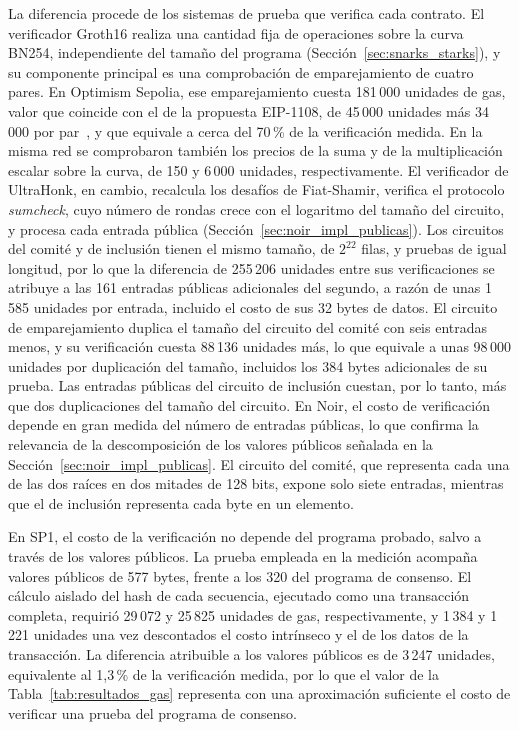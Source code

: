La diferencia procede de los sistemas de prueba que verifica cada contrato. El verificador Groth16
realiza una cantidad fija de operaciones sobre la curva BN254, independiente del tamaño del
programa (Sección~\ref{sec:snarks_starks}), y su componente principal es una comprobación de
emparejamiento de cuatro pares. En Optimism Sepolia, ese emparejamiento cuesta 181\,000 unidades
de gas, valor que coincide con el de la propuesta EIP-1108, de 45\,000 unidades más 34\,000 por
par~\cite{eip1108}, y que equivale a cerca del 70\,\% de la verificación medida. En la misma red se
comprobaron también los precios de la suma y de la multiplicación escalar sobre la curva, de 150 y
6\,000 unidades, respectivamente. El verificador de UltraHonk, en cambio, recalcula los desafíos de
Fiat-Shamir, verifica el protocolo \textit{sumcheck}, cuyo número de rondas crece con el logaritmo
del tamaño del circuito, y procesa cada entrada pública (Sección~\ref{sec:noir_impl_publicas}). Los
circuitos del comité y de inclusión tienen el mismo tamaño, de $2^{22}$ filas, y pruebas de igual
longitud, por lo que la diferencia de 255\,206 unidades entre sus verificaciones se atribuye a las
161 entradas públicas adicionales del segundo, a razón de unas 1\,585 unidades por entrada,
incluido el costo de sus 32 bytes de datos. El circuito de emparejamiento duplica el tamaño del
circuito del comité con seis entradas menos, y su verificación cuesta 88\,136 unidades más, lo que
equivale a unas 98\,000 unidades por duplicación del tamaño, incluidos los 384 bytes adicionales
de su prueba. Las entradas públicas del circuito de inclusión cuestan, por lo tanto, más que dos
duplicaciones del tamaño del circuito. En Noir, el costo de verificación depende en gran medida
del número de entradas públicas, lo que confirma la relevancia de la descomposición de los valores
públicos señalada en la Sección~\ref{sec:noir_impl_publicas}. El circuito del comité, que
representa cada una de las dos raíces en dos mitades de 128 bits, expone solo siete entradas, mientras que
el de inclusión representa cada byte en un elemento.

En SP1, el costo de la verificación no depende del programa probado, salvo a través de los valores
públicos. La prueba empleada en la medición acompaña valores públicos de 577 bytes, frente a los
320 del programa de consenso. El cálculo aislado del hash de cada secuencia, ejecutado como una
transacción completa, requirió 29\,072 y 25\,825 unidades de gas, respectivamente, y 1\,384 y
1\,221 unidades una vez descontados el costo intrínseco y el de los datos de la transacción. La
diferencia atribuible a los valores públicos es de 3\,247 unidades, equivalente
al 1,3\,\% de la verificación medida, por lo que el valor de la Tabla~\ref{tab:resultados_gas}
representa con una aproximación suficiente el costo de verificar una prueba del programa de
consenso.


